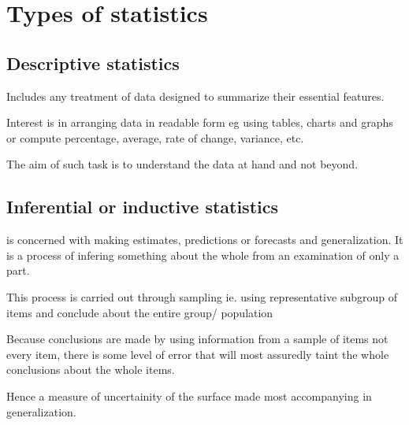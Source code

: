 \chapter{Types of statistics} %
\section{Descriptive statistics}
Includes any treatment of data designed to summarize their essential features.

Interest is in arranging data in readable form eg using tables, charts and graphs or compute percentage, average, rate of change, variance, etc.

The aim of such task is to understand the data at hand and not beyond.

\section{Inferential or inductive statistics}
is concerned with making estimates, predictions or forecasts and generalization.
It is  a process of infering something about the whole from an examination of only a part.

This process is carried out through sampling ie. using representative subgroup of items and conclude about the entire group/ population

Because conclusions are made by using information from a sample of items not every item, there is some level of error that will most assuredly taint the whole conclusions about the whole items.

Hence a measure of uncertainity of the surface made most accompanying in generalization.
\newpage
